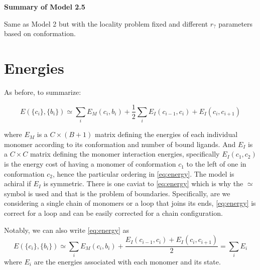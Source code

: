 \documentclass[11pt]{article}
\newcommand\set[1]{\ensuremath{\{#1\}}}
\begin{document}
\begin{center}
	\LARGE
	\textbf{Summary of Model 2.5}
	\vspace{1em}
\end{center}

Same as Model 2 but with the locality problem fixed and different $r_?$ parameters based on conformation.

\section{Energies}\label{sec:energies}
As before, to summarize:
\begin{tcolorbox}
	\begin{equation}\label{eq:energy}
		E(\set{c_i}, \set{b_i}) \simeq \sum_i E_M(c_i, b_i) + \frac{1}{2} \sum_i E_I(c_{i-1}, c_i) + E_I(c_i, c_{i+1})
	\end{equation}
\end{tcolorbox}
where $E_M$ is a $C{\times}(B+1)$ matrix defining the energies of each individual monomer according to its conformation and number of bound ligands.
And $E_I$ is a $C{\times}C$ matrix defining the monomer interaction energies, specifically $E_I(c_1, c_2)$ is the energy cost of having a monomer of conformation $c_1$ to the left of one in conformation $c_2$, hence the particular ordering in \cref{eq:energy}.
The model is achiral if $E_I$ is symmetric.
There is one caviat to \cref{eq:energy} which is why the $\simeq$ symbol is used and that is the problem of boundaries.
Specifically, are we considering a single chain of monomers or a loop that joins its ends, \cref{eq:energy} is correct for a loop and can be easily corrected for a chain configuration.

Notably, we can also write \cref{eq:energy} as
\begin{equation}\label{eq:energy_ind}
	E(\set{c_i}, \set{b_i}) \simeq \sum_i E_M(c_i, b_i) + \frac{E_I(c_{i-1}, c_i) + E_I(c_i, c_{i+1})}{2} = \sum_i E_{i}
\end{equation}
where $E_i$ are the energies associated with each monomer and its state.
\end{document}

